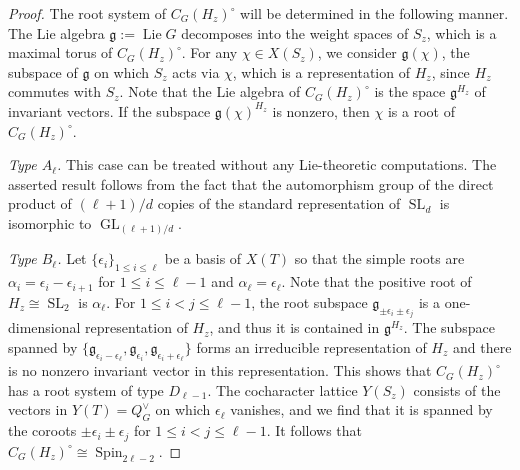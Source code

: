 \documentclass[11pt,oneside,dvipsnames]{amsart}
\theoremstyle{plain}
\theoremstyle{definition}
\theoremstyle{named}
\DeclareMathOperator{\GL}{GL}
\DeclareMathOperator{\Lie}{Lie}
\DeclareMathOperator{\SL}{SL}
\DeclareMathOperator{\Spin}{Spin}
\begin{document}
\begin{proof}
The root system of $C_G(H_z)^{\circ}$ will be determined in the following manner. The Lie algebra $\mathfrak{g}:=\Lie G$ decomposes into the weight spaces of $S_z$, which is a maximal torus of $C_G(H_z)^{\circ}$. For any $\chi\in X(S_z)$, we consider $\mathfrak{g}(\chi)$, the subspace of $\mathfrak{g}$ on which $S_z$ acts via $\chi$, which is a representation of $H_z$, since $H_z$ commutes with $S_z$. Note that the Lie algebra of $C_G(H_z)^{\circ}$ is the space $\mathfrak{g}^{H_z}$ of invariant vectors. If the subspace $\mathfrak{g}(\chi)^{H_z}$ is nonzero, then $\chi$ is a root of $C_G(H_z)^{\circ}$.

\textit{Type $A_{\ell}$.} This case can be treated without any Lie-theoretic computations. The asserted result follows from the fact that the automorphism group of the direct product of $(\ell+1)/d$ copies of the standard representation of $\SL_d$ is isomorphic to $\GL_{(\ell+1)/d}$.

\textit{Type $B_{\ell}$.} Let $\{\epsilon_i\}_{1\le i\le \ell}$ be a basis of $X(T)$ so that the simple roots are $\alpha_i=\epsilon_i-\epsilon_{i+1}$ for $1\le i\le \ell-1$ and $\alpha_{\ell}=\epsilon_{\ell}$. Note that the positive root of $H_z\cong\SL_2$ is $\alpha_{\ell}$. For $1\le i<j\le \ell-1$, the root subspace $\mathfrak{g}_{\pm\epsilon_i\pm\epsilon_j}$ is a one-dimensional representation of $H_z$, and thus it is contained in $\mathfrak{g}^{H_z}$. The subspace spanned by $\{\mathfrak{g}_{\epsilon_i-\epsilon_{\ell}},\mathfrak{g}_{\epsilon_{i}},\mathfrak{g}_{\epsilon_i+\epsilon_{\ell}}\}$ forms an irreducible representation of $H_z$ and there is no nonzero invariant vector in this representation. This shows that $C_G(H_z)^{\circ}$ has a root system of type $D_{\ell-1}$. The cocharacter lattice $Y(S_z)$ consists of the vectors in $Y(T)=Q_G^{\vee}$ on which $\epsilon_{\ell}$ vanishes, and we find that it is spanned by the coroots $\pm\epsilon_i\pm\epsilon_j$ for $1\le i<j\le \ell-1$. It follows that $C_G(H_z)^{\circ}\cong\Spin_{2\ell-2}$. 


\end{proof}
\end{document}
